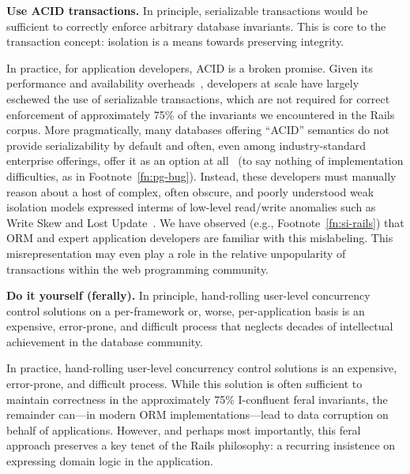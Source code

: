 \begin{impenumerate}
\item \textbf{Use ACID transactions.} In principle, serializable
  transactions would be sufficient to correctly enforce arbitrary
  database invariants. This is core to the transaction concept:
  isolation is a means towards preserving integrity. \vspace{.5em}

  \indent In practice, for application developers, ACID is a broken
  promise. Given its performance and availability
  overheads~\cite{brewer-cap}, developers at scale have largely
  eschewed the use of serializable transactions, which are not
  required for correct enforcement of approximately 75\% of the
  invariants we encountered in the Rails corpus. More pragmatically,
  many databases offering ``ACID'' semantics do not provide
  serializability by default and often, even among industry-standard
  enterprise offerings, offer it as an option at all~\cite{hat-vldb}
  (to say nothing of implementation difficulties, as in
  Footnote~\ref{fn:pg-bug}). Instead, these developers must manually
  reason about a host of complex, often obscure, and poorly understood
  weak isolation models expressed interms of low-level read/write
  anomalies such as Write Skew and Lost
  Update~\cite{adya-isolation,consistency-borders}. We have observed
  (e.g., Footnote~\ref{fn:si-rails}) that ORM and expert application
  developers are familiar with this mislabeling. This
  misrepresentation may even play a role in the relative unpopularity
  of transactions within the web programming community.

\item\textbf{Do it yourself (ferally).} In principle, hand-rolling
  user-level concurrency control solutions on a per-framework
  or, worse, per-application basis is an expensive, error-prone, and
  difficult process that neglects decades of intellectual achievement
  in the database community.\vspace{.5em}
  
  In practice, hand-rolling user-level concurrency control solutions
  is an expensive, error-prone, and difficult process. While this
  solution is often sufficient to maintain correctness in the
  approximately 75\% I-confluent feral invariants, the remainder
  can---in modern ORM implementations---lead to data corruption on
  behalf of applications. However, and perhaps most importantly, this
  feral approach preserves a key tenet of the Rails philosophy: a
  recurring insistence on expressing domain logic in the application.
\end{impenumerate}

